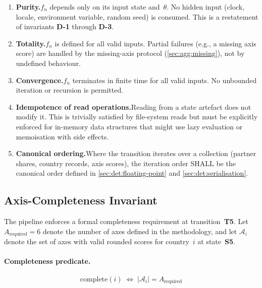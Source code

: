 \begin{enumerate}
  \item \textbf{Purity.}\enspace  \(f_n\) depends only on its input state
    and~\(\theta\).  No hidden input (clock, locale, environment variable,
    random seed) is consumed.  This is a restatement of invariants
    \textbf{D-1} through \textbf{D-3}.

  \item \textbf{Totality.}\enspace  \(f_n\) is defined for all valid inputs.
    Partial failures (e.g., a missing axis score) are handled by the
    missing-axis protocol (\cref{sec:agg:missing}), not by undefined
    behaviour.

  \item \textbf{Convergence.}\enspace  \(f_n\) terminates in finite time
    for all valid inputs.  No unbounded iteration or recursion is permitted.

  \item \textbf{Idempotence of read operations.}\enspace  Reading from
    a state artefact does not modify it.  This is trivially satisfied by
    file-system reads but must be explicitly enforced for in-memory data
    structures that might use lazy evaluation or memoisation with side
    effects.

  \item \textbf{Canonical ordering.}\enspace  Where the transition
    iterates over a collection (partner shares, country records, axis
    scores), the iteration order SHALL be the canonical order defined in
    \cref{sec:det:floating-point} and \cref{sec:det:serialisation}.
\end{enumerate}

\subsection{Axis-Completeness Invariant}\label{sec:state:completeness}

The pipeline enforces a formal completeness requirement at
transition~\textbf{T5}.  Let \(A_{\mathrm{required}} = 6\) denote the
number of axes defined in the methodology, and let \(\mathcal{A}_i\)
denote the set of axes with valid rounded scores for country~\(i\) at
state~\textbf{S5}.

\paragraph{Completeness predicate.}
\[
  \mathrm{complete}(i) \;\iff\; |\mathcal{A}_i| = A_{\mathrm{required}}
\]

